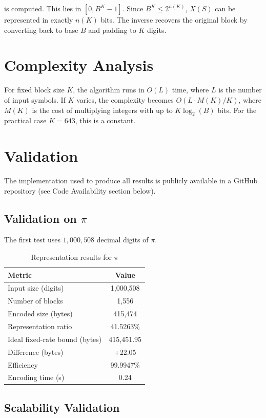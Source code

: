 \documentclass[10pt, onecolumn]{IEEEtran}
\begin{document}
is computed. This lies in $[0, B^K - 1]$. Since $B^K \le 2^{n(K)}$, $X(S)$ can be represented in exactly $n(K)$ bits. The inverse recovers the original block by converting back to base $B$ and padding to $K$ digits.

\section{Complexity Analysis}

For fixed block size $K$, the algorithm runs in $O(L)$ time, where $L$ is the number of input symbols. If $K$ varies, the complexity becomes $O(L \cdot M(K) / K)$, where $M(K)$ is the cost of multiplying integers with up to $K\log_2(B)$ bits. For the practical case $K=643$, this is a constant.

\section{Validation}

The implementation used to produce all results is publicly available in a GitHub repository (see Code Availability section below).

\subsection{Validation on $\pi$}

The first test uses $1,000,508$ decimal digits of $\pi$.

\begin{table}[ht]
\centering
\caption{Representation results for $\pi$}
\label{tab:pi}
\begin{tabular}{lc}
\toprule
Metric & Value \\
\midrule
Input size (digits) & 1,000,508 \\
Number of blocks & 1,556 \\
Encoded size (bytes) & 415,474 \\
Representation ratio & 41.5263\% \\
Ideal fixed-rate bound (bytes) & 415,451.95 \\
Difference (bytes) & +22.05 \\
Efficiency & 99.9947\% \\
Encoding time (s) & 0.24 \\
\bottomrule
\end{tabular}
\end{table}

\subsection{Scalability Validation}
\end{document}
